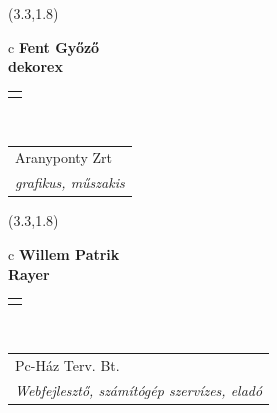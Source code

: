 \documentclass[11pt]{article}
\begin{document}
\makebox(3.3,1.8){
  \renewcommand\arraystretch{1.3}
  \begin{tabular}[c]{c}
    \hspace{8.5mm}
    \LARGE\bf{ Fent Győző }\\
    \hspace{8.5mm}
    \Large{ dekorex }\\
    \renewcommand\arraystretch{3}
    \begin{tabular}[c]{c}
      \centering
      \fontfamily{phv}\selectfont{
        \textbf{
          \textsc{
            \scriptsize{
            \color{Bright}{ Ismerkedő }\color{Dark}{ Webmester }\color{Dark}{ Sminkmester }\color{Bright}{ Programozó }
            }
          }
        }
      }
    \end{tabular}
    \\
    \renewcommand\arraystretch{1}
    \begin{tabular}{p{3.3in}}
      \hspace{.7cm}Aranyponty Zrt\\
      \hspace{.7cm}\emph{ grafikus, műszakis }\\
    \end{tabular}
  \end{tabular}
}

\makebox(3.3,1.8){
  \renewcommand\arraystretch{1.3}
  \begin{tabular}[c]{c}
    \hspace{8.5mm}
    \LARGE\bf{ Willem Patrik }\\
    \hspace{8.5mm}
    \Large{ Rayer }\\
    \renewcommand\arraystretch{3}
    \begin{tabular}[c]{c}
      \centering
      \fontfamily{phv}\selectfont{
        \textbf{
          \textsc{
            \scriptsize{
            \color{Dark}{ Ismerkedő }\color{Dark}{ Webmester }\color{Bright}{ Sminkmester }\color{Dark}{ Programozó }
            }
          }
        }
      }
    \end{tabular}
    \\
    \renewcommand\arraystretch{1}
    \begin{tabular}{p{3.3in}}
      \hspace{.7cm}Pc-Ház Terv. Bt.\\
      \hspace{.7cm}\emph{ Webfejlesztő, számítógép szervízes, eladó }\\
    \end{tabular}
  \end{tabular}
}
\end{document}

